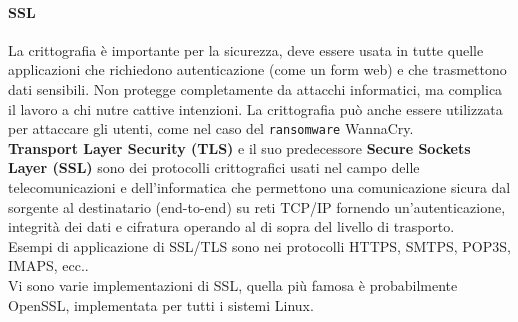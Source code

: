 \documentclass[a4paper]{report}
\begin{document}
\paragraph{SSL} La crittografia è importante per la sicurezza, deve essere usata in tutte quelle applicazioni che richiedono autenticazione (come un form web) e che trasmettono dati sensibili. Non protegge completamente da attacchi informatici, ma complica il lavoro a chi nutre cattive intenzioni. La crittografia può anche essere utilizzata per attaccare gli utenti, come nel caso del \texttt{ransomware} WannaCry.\\
\textbf{Transport Layer Security (TLS)} e il suo predecessore \textbf{Secure Sockets Layer (SSL)} sono dei protocolli crittografici usati nel campo delle telecomunicazioni e dell'informatica che permettono una comunicazione sicura dal sorgente al destinatario (end-to-end) su reti TCP/IP fornendo un'autenticazione, integrità dei dati e cifratura operando al di sopra del livello di trasporto.\\
Esempi di applicazione di SSL/TLS sono nei protocolli HTTPS, SMTPS, POP3S, IMAPS, ecc..\\
Vi sono varie implementazioni di SSL, quella più famosa è probabilmente OpenSSL, implementata per tutti i sistemi Linux.\\
\end{document}
